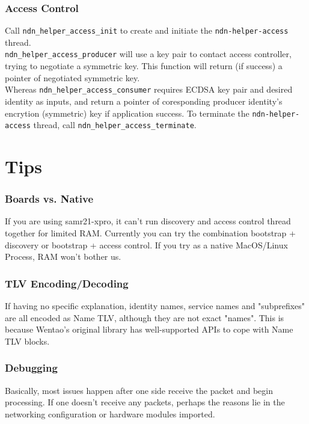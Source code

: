 \documentclass[a4paper, 11pt]{article}
\begin{document}
        \subsubsection*{Access Control}
        Call \texttt{ndn\_helper\_access\_init} to create and initiate the \texttt{ndn-helper-access} thread. \\ \texttt{ndn\_helper\_access\_producer} will use a key pair to contact access controller, trying to negotiate a symmetric key. This function will return (if success) a pointer of negotiated symmetric key.  \\ Whereas \texttt{ndn\_helper\_access\_consumer} requires ECDSA key pair and desired identity as inputs, and return a pointer of coresponding producer identity's encrytion (symmetric) key if application success. To terminate the \texttt{ndn-helper-access} thread, call \texttt{ndn\_helper\_access\_terminate}.             

        \section*{Tips}
        \subsubsection*{Boards vs. Native}
        If you are using samr21-xpro, it can't run discovery and access control thread together for limited RAM. Currently you can try the combination bootstrap + discovery or bootstrap + access control. If you try as a native MacOS/Linux Process, RAM won't bother us.
        
        \subsubsection*{TLV Encoding/Decoding}
        If having no specific explanation, identity names, service names and "subprefixes" are all encoded as Name TLV, although they are not exact "names". This is because Wentao's original library has well-supported APIs to cope with Name TLV blocks.

        \subsubsection*{Debugging}
        Basically, most issues happen after one side receive the packet and begin processing. If one doesn't receive any packets, perhaps the reasons lie in the networking configuration or hardware modules imported.
        
\end{document}
